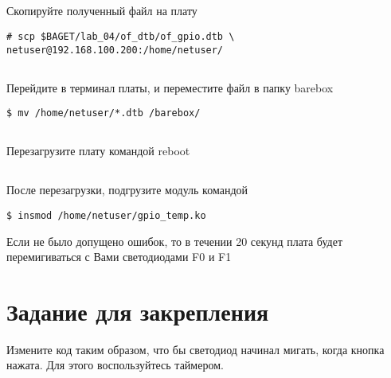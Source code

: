 \subsection{}Скопируйте полученный файл на плату
\begin{lstlisting}[style=bash]
# scp $BAGET/lab_04/of_dtb/of_gpio.dtb \
netuser@192.168.100.200:/home/netuser/
\end{lstlisting}

\subsection{}Перейдите в терминал платы, и переместите файл в папку barebox
\begin{lstlisting}[style=bash]
$ mv /home/netuser/*.dtb /barebox/
\end{lstlisting}

\subsection{}Перезагрузите плату командой reboot

\subsection{}После перезагрузки, подгрузите модуль командой
\begin{lstlisting}[style=bash]
$ insmod /home/netuser/gpio_temp.ko
\end{lstlisting}
Если не было допущено ошибок, то в течении 20 секунд плата будет перемигиваться с Вами светодиодами F0 и F1

\section{Задание для закрепления}
Измените код таким образом, что бы светодиод начинал мигать, когда кнопка нажата. Для этого воспользуйтесь таймером.


